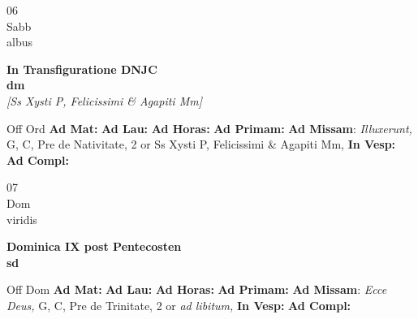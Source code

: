 \documentclass[10pt, openany]{book}
\begin{document}
    \begin{center}
        \begin{minipage}{3.5in}
            \vspace{2em}
            \begin{minipage}{0.5in}
                {\Huge 06} \\
                {\normalsize Sabb} \\
                {\normalsize albus}
            \end{minipage}
            \begin{minipage}{3.0in}
                \textbf{ \large In Transfiguratione DNJC \\
                \textnormal{\normalsize dm}} \\ \textit{[Ss Xysti P, Felicissimi \& Agapiti Mm]} \\ 
            \end{minipage}
            \begin{justify}Off Ord
                \textbf{Ad Mat: }
                \textbf{Ad Lau: }
                \textbf{Ad Horas: }
                \textbf{Ad Primam: }\textbf{Ad Missam}: \textit{Illuxerunt,} G, C, Pre de Nativitate, 2 or Ss Xysti P, Felicissimi \& Agapiti Mm,  
                \textbf{In Vesp: }
                \textbf{Ad Compl: }
            \end{justify}
        \end{minipage}
    \end{center}

    \begin{center}
        \begin{minipage}{3.5in}
            \vspace{2em}
            \begin{minipage}{0.5in}
                {\Huge 07} \\
                {\normalsize Dom} \\
                {\normalsize viridis}
            \end{minipage}
            \begin{minipage}{3.0in}
                \textbf{ \large Dominica IX post Pentecosten \\
                \textnormal{\normalsize sd}} \\ 
            \end{minipage}
            \begin{justify}Off Dom
                \textbf{Ad Mat: }
                \textbf{Ad Lau: }
                \textbf{Ad Horas: }
                \textbf{Ad Primam: }\textbf{Ad Missam}: \textit{Ecce Deus,} G, C, Pre de Trinitate, 2 or \textit{ad libitum,}  
                \textbf{In Vesp: }
                \textbf{Ad Compl: }
            \end{justify}
        \end{minipage}
    \end{center}
\end{document}
